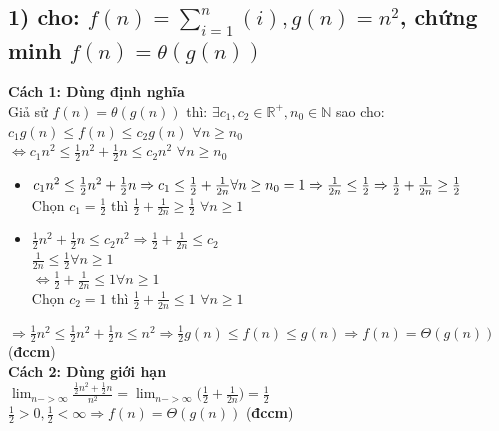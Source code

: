 \documentclass[10pt,a4paper]{article}
\begin{document}
\subsection*{1) cho: $f(n) = \sum_{i=1}^{n}(i), g(n) = n^2$, chứng minh $f(n) = \theta(g(n))$}
\textbf{Cách 1: Dùng định nghĩa}\\
Giả sử $f(n) = \theta(g(n))$ thì: $\exists c_1, c_2 \in \mathbb{R^+},n_0 \in \mathbb{N}$ sao cho: $c_1g(n)\leq f(n)\leq c_2g(n)$ $\forall n \geq n_0$\\
$\Leftrightarrow c_1n^2\leq \frac{1}{2}n^2+\frac{1}{2}n\leq c_2n^2$ $\forall n \geq n_0$
\begin{itemize}
    \item $c_1n^2\leq \frac{1}{2}n^2+\frac{1}{2}n \Rightarrow c_1 \leq \frac{1}{2} + \frac{1}{2n}\\
    \forall n \geq n_0 = 1 \Rightarrow \frac{1}{2n} \leq \frac{1}{2} \Rightarrow \frac{1}{2} + \frac{1}{2n} \geq \frac{1}{2}$\\
    Chọn $c_1 = \frac{1}{2}$ thì $\frac{1}{2} + \frac{1}{2n} \geq \frac{1}{2}$ $\forall n\geq 1$
    \item $\frac{1}{2}n^2+\frac{1}{2}n\leq c_2n^2 \Rightarrow \frac{1}{2} + \frac{1}{2n} \leq c_2$\\
    $\frac{1}{2n} \leq \frac{1}{2} \forall n \geq 1$\\
    $\Leftrightarrow \frac{1}{2} + \frac{1}{2n} \leq 1 \forall n \geq 1$\\
    Chọn $c_2 = 1$ thì $\frac{1}{2} + \frac{1}{2n} \leq 1$ $\forall n\geq 1$
\end{itemize}
$\Rightarrow \frac{1}{2}n^2 \leq \frac{1}{2}n^2+\frac{1}{2}n \leq n^2 \Rightarrow\frac{1}{2}g(n) \leq f(n) \leq g(n) \Rightarrow f(n) = \Theta(g(n))$ (\textbf{đccm})\\
\textbf{Cách 2: Dùng giới hạn}\\
$\lim_{n->\infty}\frac{\frac{1}{2}n^2+\frac{1}{2}n}{n^2} = \lim_{n->\infty}\big(\frac{1}{2} + \frac{1}{2n}\big)=\frac{1}{2}$ \\
$\frac{1}{2} > 0, \frac{1}{2} < \infty \Rightarrow f(n) = \Theta(g(n))$ (\textbf{đccm})\\
\end{document}
